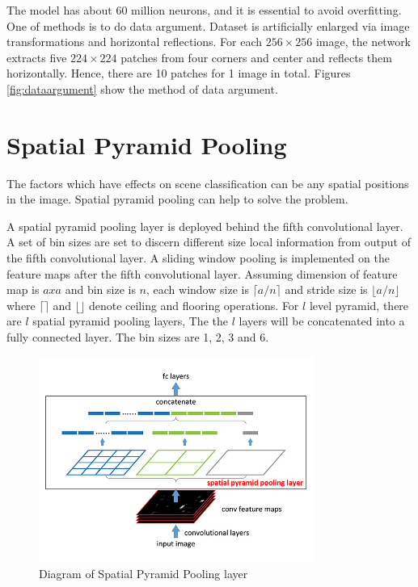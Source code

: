 The model has about 60 million neurons, and it is essential to avoid overfitting. One of methods is to do data argument. Dataset is artificially enlarged via image transformations and horizontal reflections. For each $256\times256$ image, the network extracts five $224\times224$ patches from four corners and center and reflects them horizontally. Hence, there are 10 patches for 1 image in total. Figures \ref{fig:dataargument} show the method of data argument.

\section{Spatial Pyramid Pooling}

The factors which have effects on scene classification can be any spatial positions in the image. Spatial pyramid pooling can help to solve the problem.

A spatial pyramid pooling layer is deployed behind the fifth convolutional layer. A set of bin sizes are set to discern different size local information from output of the fifth convolutional layer.  A sliding window pooling  is implemented on the feature maps after the fifth convolutional layer. Assuming dimension of feature map is $axa$ and bin size is $n$, each window size is $\lceil a/n \rceil$ and stride size is $\lfloor a/n \rfloor$ where $\lceil \rceil$ and $\lfloor \rfloor$ denote ceiling and flooring operations. For $l$ level pyramid, there are $l$ spatial pyramid pooling layers, The the $l$ layers will be concatenated into a fully connected layer. The bin sizes are 1, 2, 3 and 6.

\begin{figure}[htb]
    \centering
	\includegraphics[width=0.8\textwidth]{sppnet.jpg}
    \caption{Diagram of Spatial Pyramid Pooling layer}%
    \label{fig:sppnet}%
\end{figure}

